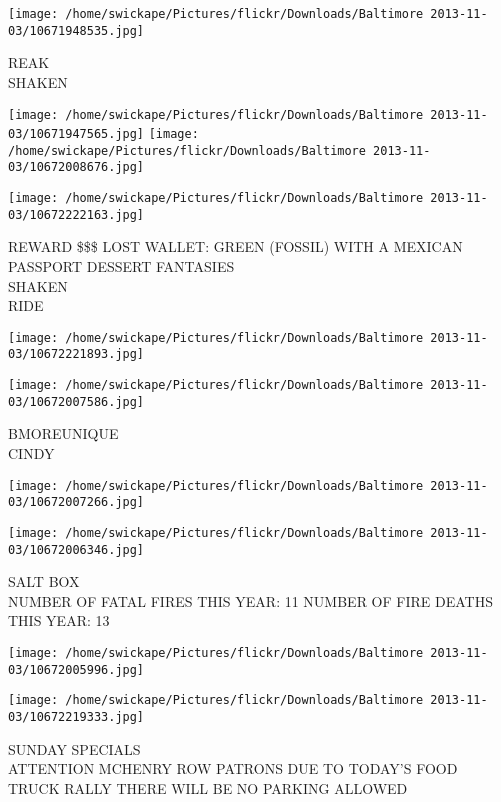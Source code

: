 \documentclass[10pt,letterpaper]{article}
\begin{document}
\vspace{0.25in}
\texttt{[image: /home/swickape/Pictures/flickr/Downloads/Baltimore 2013-11-03/10671948535.jpg]}

REAK\\
SHAKEN\\
\pagebreak

\texttt{[image: /home/swickape/Pictures/flickr/Downloads/Baltimore 2013-11-03/10671947565.jpg]}
\texttt{[image: /home/swickape/Pictures/flickr/Downloads/Baltimore 2013-11-03/10672008676.jpg]}

\texttt{[image: /home/swickape/Pictures/flickr/Downloads/Baltimore 2013-11-03/10672222163.jpg]}

REWARD \$\$\$ LOST WALLET: GREEN (FOSSIL) WITH A MEXICAN PASSPORT DESSERT FANTASIES\\
SHAKEN\\
RIDE\\
\pagebreak

\texttt{[image: /home/swickape/Pictures/flickr/Downloads/Baltimore 2013-11-03/10672221893.jpg]}

\vspace{0.25in}
\texttt{[image: /home/swickape/Pictures/flickr/Downloads/Baltimore 2013-11-03/10672007586.jpg]}

BMOREUNIQUE\\
CINDY\\
\pagebreak

\texttt{[image: /home/swickape/Pictures/flickr/Downloads/Baltimore 2013-11-03/10672007266.jpg]}

\vspace{0.25in}
\texttt{[image: /home/swickape/Pictures/flickr/Downloads/Baltimore 2013-11-03/10672006346.jpg]}

SALT BOX\\
NUMBER OF FATAL FIRES THIS YEAR: 11 NUMBER OF FIRE DEATHS THIS YEAR: 13\\
\pagebreak

\texttt{[image: /home/swickape/Pictures/flickr/Downloads/Baltimore 2013-11-03/10672005996.jpg]}

\vspace{0.25in}
\texttt{[image: /home/swickape/Pictures/flickr/Downloads/Baltimore 2013-11-03/10672219333.jpg]}

SUNDAY SPECIALS\\
ATTENTION MCHENRY ROW PATRONS DUE TO TODAY'S FOOD TRUCK RALLY THERE WILL BE NO PARKING ALLOWED\\
\pagebreak
\end{document}
